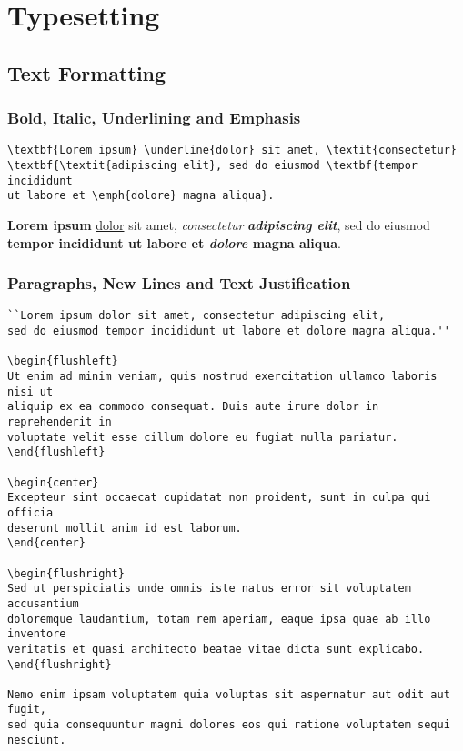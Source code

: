 \chapter*{Typesetting}

\section*{Text Formatting}

\subsection*{Bold, Italic, Underlining and Emphasis}

\begin{lstlisting}[caption={Bold, italic, underlining and emphasis.}]
\textbf{Lorem ipsum} \underline{dolor} sit amet, \textit{consectetur}
\textbf{\textit{adipiscing elit}, sed do eiusmod \textbf{tempor incididunt
ut labore et \emph{dolore} magna aliqua}.
\end{lstlisting}

\textbf{Lorem ipsum} \underline{dolor} sit amet, \textit{consectetur}
\textbf{\textit{adipiscing elit}}, sed do eiusmod \textbf{tempor incididunt
ut labore et \emph{dolore} magna aliqua}.

\subsection*{Paragraphs, New Lines and Text Justification}

\begin{lstlisting}[caption={Paragraphs, new lines and text justification.}]
``Lorem ipsum dolor sit amet, consectetur adipiscing elit,
sed do eiusmod tempor incididunt ut labore et dolore magna aliqua.''

\begin{flushleft}
Ut enim ad minim veniam, quis nostrud exercitation ullamco laboris nisi ut
aliquip ex ea commodo consequat. Duis aute irure dolor in reprehenderit in
voluptate velit esse cillum dolore eu fugiat nulla pariatur.
\end{flushleft}

\begin{center}
Excepteur sint occaecat cupidatat non proident, sunt in culpa qui officia
deserunt mollit anim id est laborum.
\end{center}

\begin{flushright}
Sed ut perspiciatis unde omnis iste natus error sit voluptatem accusantium
doloremque laudantium, totam rem aperiam, eaque ipsa quae ab illo inventore
veritatis et quasi architecto beatae vitae dicta sunt explicabo.
\end{flushright}

Nemo enim ipsam voluptatem quia voluptas sit aspernatur aut odit aut fugit,
sed quia consequuntur magni dolores eos qui ratione voluptatem sequi nesciunt.
\end{lstlisting}

